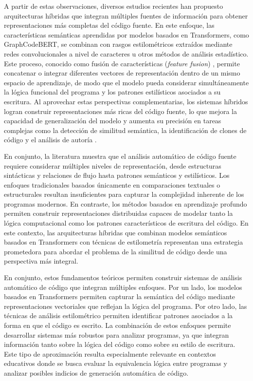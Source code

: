 A partir de estas observaciones, diversos estudios recientes han propuesto arquitecturas híbridas que integran múltiples fuentes de información para obtener representaciones más completas del código fuente. En este enfoque, las características semánticas aprendidas por modelos basados en Transformers, como GraphCodeBERT, se combinan con rasgos estilométricos extraídos mediante redes convolucionales a nivel de caracteres u otros métodos de análisis estadístico. Este proceso, conocido como fusión de características (\textit{feature fusion}) \cite{MartinezGil2026Improving}, permite concatenar o integrar diferentes vectores de representación dentro de un mismo espacio de aprendizaje, de modo que el modelo pueda considerar simultáneamente la lógica funcional del programa y los patrones estilísticos asociados a su escritura. Al aprovechar estas perspectivas complementarias, los sistemas híbridos logran construir representaciones más ricas del código fuente, lo que mejora la capacidad de generalización del modelo y aumenta su precisión en tareas complejas como la detección de similitud semántica, la identificación de clones de código y el análisis de autoría \cite{MartinezGil2026Improving}.

En conjunto, la literatura muestra que el análisis automático de código fuente requiere considerar múltiples niveles de representación, desde estructuras sintácticas y relaciones de flujo hasta patrones semánticos y estilísticos. Los enfoques tradicionales basados únicamente en comparaciones textuales o estructurales resultan insuficientes para capturar la complejidad inherente de los programas modernos. En contraste, los métodos basados en aprendizaje profundo permiten construir representaciones distribuidas capaces de modelar tanto la lógica computacional como los patrones característicos de escritura del código. En este contexto, las arquitecturas híbridas que combinan modelos semánticos basados en Transformers con técnicas de estilometría representan una estrategia prometedora para abordar el problema de la similitud de código desde una perspectiva más integral.

En conjunto, estos fundamentos teóricos permiten construir sistemas de análisis automático de código que integran múltiples enfoques. Por un lado, los modelos basados en Transformers permiten capturar la semántica del código mediante representaciones vectoriales que reflejan la lógica del programa. Por otro lado, las técnicas de análisis estilométrico permiten identificar patrones asociados a la forma en que el código es escrito. La combinación de estos enfoques permite desarrollar sistemas más robustos para analizar programas, ya que integran información tanto sobre la lógica del código como sobre su estilo de escritura. Este tipo de aproximación resulta especialmente relevante en contextos educativos donde se busca evaluar la equivalencia lógica entre programas y analizar posibles indicios de generación automática de código.